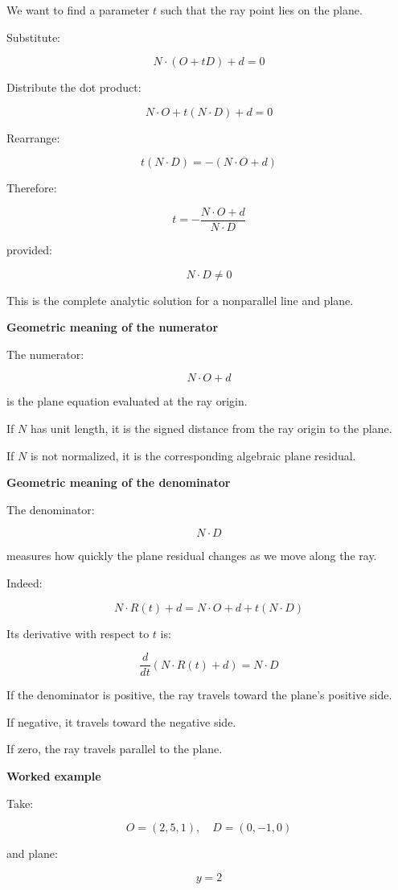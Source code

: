 We want to find a parameter \(t\) such that the ray point lies on the plane.

Substitute:

\[
N\cdot(O+tD)+d=0
\]

Distribute the dot product:

\[
N\cdot O+t(N\cdot D)+d=0
\]

Rearrange:

\[
t(N\cdot D)=-(N\cdot O+d)
\]

Therefore:

\[
\boxed{ t= -\frac{N\cdot O+d}{N\cdot D} }
\]

provided:

\[
N\cdot D\ne0
\]

This is the complete analytic solution for a nonparallel line and plane.

\textbf{Geometric meaning of the numerator}

The numerator:

\[
N\cdot O+d
\]

is the plane equation evaluated at the ray origin.

If \(N\) has unit length, it is the signed distance from the ray origin to the plane.

If \(N\) is not normalized, it is the corresponding algebraic plane residual.

\textbf{Geometric meaning of the denominator}

The denominator:

\[
N\cdot D
\]

measures how quickly the plane residual changes as we move along the ray.

Indeed:

\[
N\cdot R(t)+d= N\cdot O+d+t(N\cdot D)
\]

Its derivative with respect to \(t\) is:

\[
\frac{d}{dt}(N\cdot R(t)+d)=N\cdot D
\]

If the denominator is positive, the ray travels toward the plane's positive side.

If negative, it travels toward the negative side.

If zero, the ray travels parallel to the plane.

\textbf{Worked example}

Take:

\[
O=(2,5,1),\quad D=(0,-1,0)
\]

and plane:

\[
y=2
\]

